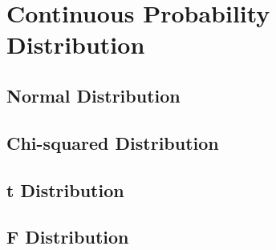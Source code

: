 \section{Continuous Probability Distribution}

\subsection{Normal Distribution}


\subsection{Chi-squared Distribution}


\subsection{t Distribution}


\subsection{F Distribution}